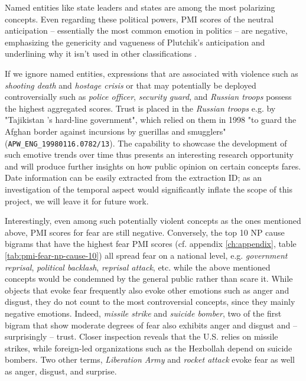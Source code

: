 Named entities like state leaders and states are among the most polarizing concepts. Even regarding these political powers, PMI scores of the neutral anticipation -- essentially the most common emotion in politics -- are negative, emphasizing the genericity and vagueness of Plutchik's anticipation and underlining why it isn't used in other classifications
\cite{ekman_basic_emotions}.

If we ignore named entities, expressions that are associated with violence such as \textit{shooting death} and \textit{hostage crisis} or that may potentially be deployed controversially such as \textit{police officer}, \textit{security guard}, and \textit{Russian troops} possess the highest aggregated scores. Trust is placed in the \textit{Russian troops} e.g. by "Tajikistan 's hard-line government", which relied on them in 1998 "to guard the Afghan border against incursions by guerillas and smugglers" (\texttt{APW\_ENG\_19980116.0782/13}). The capability to showcase the development of such emotive trends over time thus presents an interesting research opportunity and will produce further insights on how public opinion on certain concepts fares. Date information can be easily extracted from the extraction ID; as an investigation of the temporal aspect would significantly inflate the scope of this project, we will leave it for future work.

Interestingly, even among such potentially violent concepts as the ones mentioned above, PMI scores for fear are still negative. Conversely, the top 10 NP cause bigrams that have the highest fear PMI scores (cf. appendix \ref{ch:appendix}, table \ref{tab:pmi-fear-np-cause-10}) all spread fear on a national level, e.g. \textit{government reprisal}, \textit{political backlash}, \textit{reprisal attack}, etc. while the above mentioned concepts would be condemned by the general public rather than scare it. While objects that evoke fear frequently also evoke other emotions such as anger and disgust, they do not count to the most controversial concepts, since they mainly negative emotions. Indeed, \textit{missile strike} and \textit{suicide bomber}, two of the first bigram that show moderate degrees of fear also exhibits anger and disgust and -- surprisingly -- trust. Closer inspection reveals that the U.S. relies on missile strikes, while foreign-led organizations such as the Hezbollah depend on suicide bombers. Two other terms, \textit{Liberation Army} and \textit{rocket attack} evoke fear as well as anger, disgust, and surprise.

